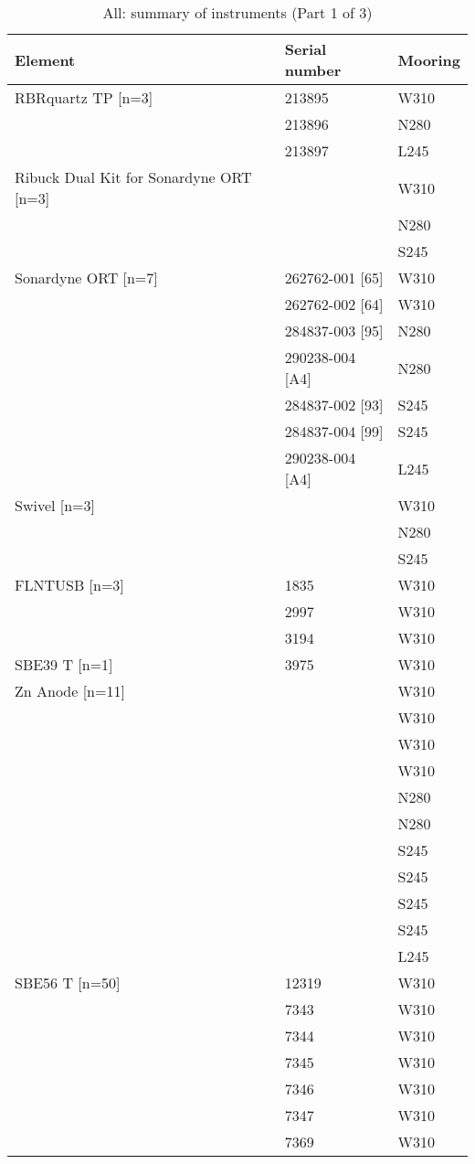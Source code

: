 \documentclass{article}
\begin{document}
\begin{table}[!htbp]
\centering
\caption{All: summary of instruments (Part 1 of 3)}
\begin{tabular}{lll}
\toprule
Element & Serial number & Mooring \\
\midrule
RBRquartz TP [n=3] & 213895 & W310 \\
 & 213896 & N280 \\
 & 213897 & L245 \\
Ribuck Dual Kit for Sonardyne ORT [n=3] &  & W310 \\
 &  & N280 \\
 &  & S245 \\
Sonardyne ORT [n=7] & 262762-001 [65] & W310 \\
 & 262762-002 [64] & W310 \\
 & 284837-003 [95] & N280 \\
 & 290238-004 [A4] & N280 \\
 & 284837-002 [93] & S245 \\
 & 284837-004 [99] & S245 \\
 & 290238-004 [A4] & L245 \\
Swivel [n=3] &  & W310 \\
 &  & N280 \\
 &  & S245 \\
FLNTUSB [n=3] & 1835 & W310 \\
 & 2997 & W310 \\
 & 3194 & W310 \\
SBE39 T [n=1] & 3975 & W310 \\
Zn Anode [n=11] &  & W310 \\
 &  & W310 \\
 &  & W310 \\
 &  & W310 \\
 &  & N280 \\
 &  & N280 \\
 &  & S245 \\
 &  & S245 \\
 &  & S245 \\
 &  & S245 \\
 &  & L245 \\
SBE56 T [n=50] & 12319 & W310 \\
 & 7343 & W310 \\
 & 7344 & W310 \\
 & 7345 & W310 \\
 & 7346 & W310 \\
 & 7347 & W310 \\
 & 7369 & W310 \\

\end{tabular}
\end{table}
\end{document}
